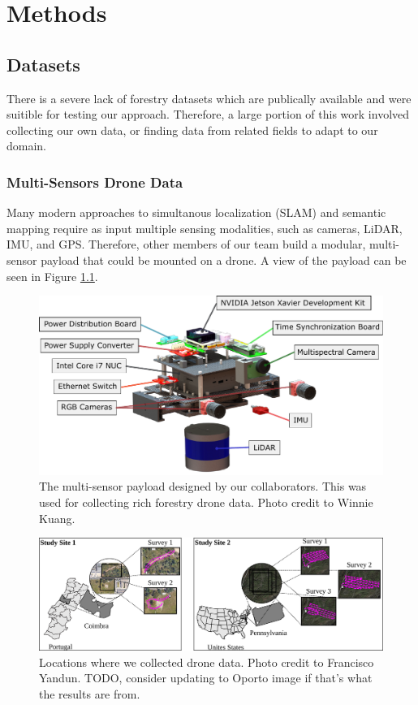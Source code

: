 \chapter{Methods} \label{chapMethod}
\section{Datasets}
There is a severe lack of forestry datasets which are publically available and were suitible for testing our approach. Therefore, a large portion of this work involved collecting our own data, or finding data from related fields to adapt to our domain.
\subsection{ Multi-Sensors Drone Data}
Many modern approaches to simultanous localization (SLAM) and semantic mapping require as input multiple sensing modalities, such as cameras, LiDAR, IMU, and GPS. Therefore, other members of our team build a modular, multi-sensor payload that could be mounted on a drone. A view of the payload can be seen in Figure \ref{fig:methods:payload}. 

\begin{figure}
    \centering
    \includegraphics[width=\textwidth]{figs/methods/datasets/payload_annotated.pdf}
    \caption{The multi-sensor payload designed by our collaborators. This was used for collecting rich forestry drone data. Photo credit to Winnie Kuang.}
    \label{fig:methods:payload}
\end{figure}


\begin{figure}
    \centering
    \includegraphics[width=\textwidth]{figs/methods/datasets/studySites1.png}
    \caption{Locations where we collected drone data. Photo credit to Francisco Yandun. TODO, consider updating to Oporto image if that's what the results are from.}
    \label{fig:methods:data_site}
\end{figure}

